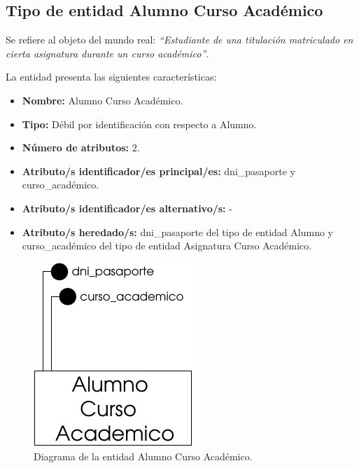 \subsection{Tipo de entidad Alumno Curso Académico}

   \begin{description}

   \item[Definición] Se refiere al objeto del mundo real: \emph{``Estudiante de
   una titulación matriculado en cierta asignatura durante un curso académico''}.

   \item[Características] La entidad presenta las siguientes características:
      \begin{itemize}
         \item \textbf{Nombre:} Alumno Curso Académico.
         \item \textbf{Tipo:} Débil por identificación con respecto a Alumno.
         \item \textbf{Número de atributos:} 2.
         \item \textbf{Atributo/s identificador/es principal/es:} dni\_pasaporte y \\curso\_académico.
         \item \textbf{Atributo/s identificador/es alternativo/s:} -
         \item \textbf{Atributo/s heredado/s:} dni\_pasaporte del tipo de entidad Alumno y curso\_académico del tipo de entidad Asignatura Curso Académico.
      \end{itemize}

   \item[Diagrama]
   \item \begin{figure}[h!]
            \begin{center}
            \includegraphics[]{07.Modelo_Entidad-Interrelacion/7.2.Analisis_Entidades/diagramas/alumnoca.pdf}
            \caption{Diagrama de la entidad Alumno Curso Académico.}
            \end{center}
         \end{figure}


\end{description}
